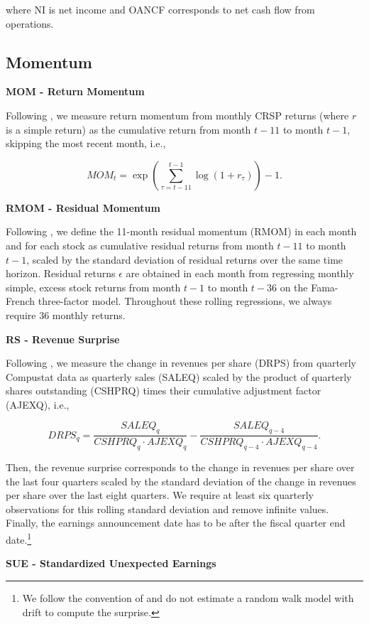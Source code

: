 \documentclass[
  article]{jss}
\begin{document}
where NI is net income and OANCF corresponds to net cash flow from
operations.

\subsection{Momentum}\label{momentum}

\textbf{MOM - Return Momentum}

Following \citet{fama.1996}, we measure return momentum from monthly
CRSP returns (where \(r\) is a simple return) as the cumulative return
from month \(t-11\) to month \(t-1\), skipping the most recent month,
i.e.,

\[
MOM_t = \exp\left(\sum^{t-1}_{\tau = t-11}\log(1 + r_{\tau})\right) - 1\text{.}
\]

\textbf{RMOM - Residual Momentum}

Following \citet{blitz.2011}, we define the 11-month residual momentum
(RMOM) in each month and for each stock as cumulative residual returns
from month \(t-11\) to month \(t-1\), scaled by the standard deviation
of residual returns over the same time horizon. Residual returns
\(\epsilon\) are obtained in each month from regressing monthly simple,
excess stock returns from month \(t-1\) to month \(t-36\) on the
Fama-French three-factor model. Throughout these rolling regressions, we
always require 36 monthly returns.

\textbf{RS - Revenue Surprise}

Following \citet{jegadeesh.2006}, we measure the change in revenues per
share (DRPS) from quarterly Compustat data as quarterly sales (SALEQ)
scaled by the product of quarterly shares outstanding (CSHPRQ) times
their cumulative adjustment factor (AJEXQ), i.e.,

\[
DRPS_{q}= \frac{SALEQ_{q}}{CSHPRQ_{q} \cdot AJEXQ_{q}} - \frac{SALEQ_{q-4}}{CSHPRQ_{q-4} \cdot AJEXQ_{q-4}}\text{.}
\]

Then, the revenue surprise corresponds to the change in revenues per
share over the last four quarters scaled by the standard deviation of
the change in revenues per share over the last eight quarters. We
require at least six quarterly observations for this rolling standard
deviation and remove infinite values. Finally, the earnings announcement
date has to be after the fiscal quarter end date.\footnote{We follow the
  convention of \citet{hou.2020} and do not estimate a random walk model
  with drift to compute the surprise.}

\textbf{SUE - Standardized Unexpected Earnings}
\end{document}
